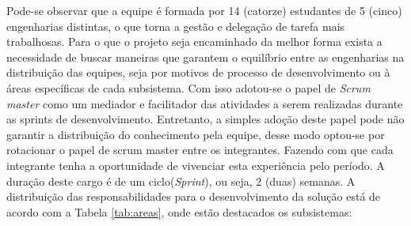 	Pode-se observar que a equipe é formada por 14 (catorze) estudantes de 5 (cinco) engenharias distintas, o que torna a gestão e delegação de tarefa mais trabalhosas. Para o que o projeto seja encaminhado da melhor forma exista a necessidade de buscar maneiras que garantem o equilíbrio entre as engenharias na distribuição das equipes, seja por motivos de processo de desenvolvimento ou à áreas específicas de cada subsistema. Com isso adotou-se o papel de \textit{Scrum master} como um mediador e facilitador das atividades a serem realizadas durante as sprints de desenvolvimento.
	Entretanto, a simples adoção deste papel pode não garantir a distribuição do conhecimento pela equipe, desse modo optou-se por rotacionar o papel de scrum master entre os integrantes. Fazendo com que cada integrante tenha a oportunidade de vivenciar esta experiência pelo período. A duração deste cargo é de um ciclo(\textit{Sprint}), ou seja, 2 (duas) semanas. A distribuição das responsabilidades para o desenvolvimento da solução está de acordo com a Tabela \ref{tab:areas}, onde estão destacados os subsistemas:

